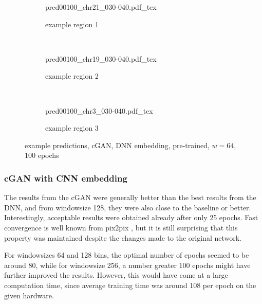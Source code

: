 \begin{figure}[p] %
    \begin{subfigure}{\textwidth}
        \centering
        \scriptsize
        {pred00100_chr21_030-040.pdf_tex}
        \caption{example  region 1} \label{fig:results:cGAN64_pretrain-dnn_r1}
    \end{subfigure}\\[6mm]
    \begin{subfigure}{\textwidth}
        \centering
        \scriptsize
        {pred00100_chr19_030-040.pdf_tex}
        \caption{example region 2} \label{fig:results:cGAN64_pretrain-dnn_r2}
    \end{subfigure}\\[6mm]
    \begin{subfigure}{\textwidth}
        \centering
        \scriptsize
        {pred00100_chr3_030-040.pdf_tex}
        \caption{example region 3} \label{fig:results:cGAN64_pretrain-dnn_r3}
    \end{subfigure}
    \caption{example predictions, cGAN, DNN embedding, pre-trained, $w=64$, 100 epochs} \label{fig:results:cGAN64_pretrain-dnn_matrices}
\end{figure}


\subsubsection{cGAN with CNN embedding} \label{sec:results:cgan_cnn}
The results from the cGAN were generally better than the best results from the DNN,
and from windowsize 128, they were also close to the baseline or better.
Interestingly, acceptable results were obtained already after only 25 epochs.
Fast convergence is well known from pix2pix \cite{Isola2017}, but it is still surprising that
this property was maintained despite the changes made to the original network.

For windowsizes 64 and 128 bins, the optimal number of epochs seemed to be around 80,
while for windowsize 256, a number greater 100 epochs might have further improved the results.
However, this would have come at a large computation time, 
since average training time was around \SI{108}{\min} per epoch on the given hardware.

